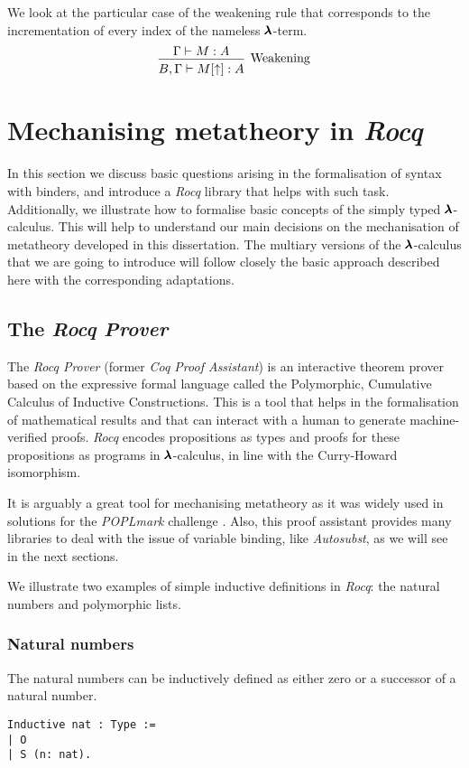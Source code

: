 We look at the particular case of the weakening rule that corresponds to the incrementation of every index of the nameless $\pmb{\lambda}$-term.
\[
  \begin{prooftree}
    \hypo{ \Gamma \vdash M:A }
    \infer1[Weakening]{ B, \Gamma \vdash M[\uparrow]:A } 
  \end{prooftree}
\]


\section{Mechanising metatheory in \textit{Rocq}}

In this section we discuss basic questions arising in the formalisation of syntax with binders, and introduce a \textit{Rocq} library that helps with such task.
Additionally, we illustrate how to formalise basic concepts of the simply typed $\pmb{\lambda}$-calculus.
This will help to understand our main decisions on the mechanisation of metatheory developed in this dissertation.
The multiary versions of the $\pmb{\lambda}$-calculus that we are going to introduce will follow closely the basic approach described here with the corresponding adaptations.

\subsection{The \textit{Rocq Prover}}

The \textit{Rocq Prover} (former \textit{Coq Proof Assistant}) \cite{RocqManual} is an interactive theorem prover based on the expressive formal language called the Polymorphic, Cumulative Calculus of Inductive Constructions.
This is a tool that helps in the formalisation of mathematical results and that can interact with a human to generate machine-verified proofs.
\textit{Rocq} encodes propositions as types and proofs for these propositions as programs in $\pmb{\lambda}$-calculus, in line with the Curry-Howard isomorphism.

It is arguably a great tool for mechanising metatheory as it was widely used in solutions for the \textit{POPLmark} challenge \cite{POPLmark}.
Also, this proof assistant provides many libraries to deal with the issue of variable binding, like \textit{Autosubst}, as we will see in the next sections.

We illustrate two examples of simple inductive definitions in \textit{Rocq}: the natural numbers and polymorphic lists.

\subsubsection{Natural numbers}
The natural numbers can be inductively defined as either zero or a successor of a natural number.
\begin{lstlisting}[language=Coq]
Inductive nat : Type :=
| O
| S (n: nat).
\end{lstlisting}

